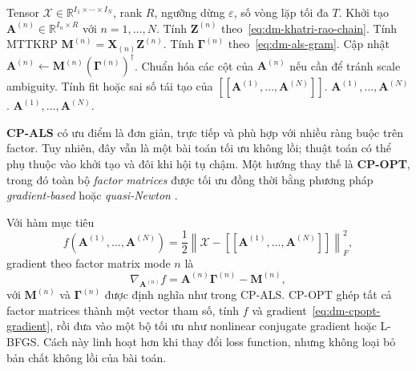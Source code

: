 \begin{algorithm}[H]
\caption{CP-ALS cho bài toán~\eqref{eq:dm-cp-objective}}
\label{alg:dm-cp-als}
\begin{algorithmic}[1]
    \Require Tensor $\mathcal{X}\in\mathbb{R}^{I_1\times\cdots\times I_N}$, rank $R$, ngưỡng dừng $\varepsilon$, số vòng lặp tối đa $T$.
    \State Khởi tạo $\mathbf{A}^{(n)}\in\mathbb{R}^{I_n\times R}$ với $n=1,\ldots,N$.
            \State Tính $\mathbf{Z}^{(n)}$ theo~\eqref{eq:dm-khatri-rao-chain}.
            \State Tính MTTKRP $\mathbf{M}^{(n)}=\mathbf{X}_{(n)}\mathbf{Z}^{(n)}$.
            \State Tính $\boldsymbol{\Gamma}^{(n)}$ theo~\eqref{eq:dm-als-gram}.
            \State Cập nhật $\mathbf{A}^{(n)}\leftarrow \mathbf{M}^{(n)}(\boldsymbol{\Gamma}^{(n)})^\dagger$.
            \State Chuẩn hóa các cột của $\mathbf{A}^{(n)}$ nếu cần để tránh scale ambiguity.
        \EndFor
        \State Tính fit hoặc sai số tái tạo của $[\![\mathbf{A}^{(1)},\ldots,\mathbf{A}^{(N)}]\!]$.
            \State \Return $\mathbf{A}^{(1)},\ldots,\mathbf{A}^{(N)}$.
        \EndIf
    \EndFor
    \State \Return $\mathbf{A}^{(1)},\ldots,\mathbf{A}^{(N)}$.
\end{algorithmic}
\end{algorithm}

\textbf{CP-ALS} có ưu điểm là đơn giản, trực tiếp và phù hợp với nhiều ràng buộc trên factor. Tuy nhiên, đây vẫn là một bài toán tối ưu không lồi; thuật toán có thể phụ thuộc vào khởi tạo và đôi khi hội tụ chậm. Một hướng thay thế là \textbf{CP-OPT}, trong đó toàn bộ \textit{factor matrices} được tối ưu đồng thời bằng phương pháp \textit{gradient-based} hoặc \textit{quasi-Newton} \cite{chrysos2025foundationsTutorial}.

Với hàm mục tiêu
\begin{equation}
    f(\mathbf{A}^{(1)},\ldots,\mathbf{A}^{(N)})
    =
    \frac{1}{2}
    \left\|
    \mathcal{X}
    -
    [\![\mathbf{A}^{(1)},\ldots,\mathbf{A}^{(N)}]\!]
    \right\|_F^2,
    \label{eq:dm-cpopt-objective}
\end{equation}
gradient theo factor matrix mode $n$ là
\begin{equation}
    \nabla_{\mathbf{A}^{(n)}} f
    =
    \mathbf{A}^{(n)}\boldsymbol{\Gamma}^{(n)}
    -
    \mathbf{M}^{(n)},
    \label{eq:dm-cpopt-gradient}
\end{equation}
với $\mathbf{M}^{(n)}$ và $\boldsymbol{\Gamma}^{(n)}$ được định nghĩa như trong CP-ALS. CP-OPT ghép tất cả factor matrices thành một vector tham số, tính $f$ và gradient~\eqref{eq:dm-cpopt-gradient}, rồi đưa vào một bộ tối ưu như nonlinear conjugate gradient hoặc L-BFGS. Cách này linh hoạt hơn khi thay đổi loss function, nhưng không loại bỏ bản chất không lồi của bài toán.

